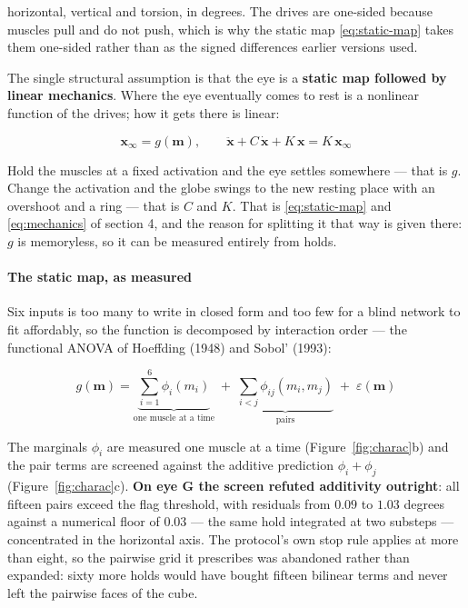 \documentclass[10pt]{article}
\begin{document}
horizontal, vertical and torsion, in degrees. The drives are one-sided because muscles pull
and do not push, which is why the static map \eqref{eq:static-map} takes them one-sided
rather than as the signed differences earlier versions used.

The single structural assumption is that the eye is a \textbf{static map followed by linear
mechanics}. Where the eye eventually comes to rest is a nonlinear function of the drives;
how it gets there is linear:

\begin{equation}
\mathbf{x}_{\infty}=g(\mathbf{m}),
\qquad
\ddot{\mathbf{x}}+C\,\dot{\mathbf{x}}+K\,\mathbf{x}=K\,\mathbf{x}_{\infty}
\label{eq:hammerstein}
\end{equation}

Hold the muscles at a fixed activation and the eye settles somewhere --- that is $g$. Change
the activation and the globe swings to the new resting place with an overshoot and a ring
--- that is $C$ and $K$. That is \eqref{eq:static-map} and \eqref{eq:mechanics} of section
4, and the reason for splitting it that way is given there: $g$ is memoryless, so it can be
measured entirely from holds.

\paragraph{The static map, as measured}

Six inputs is too many to write in closed form and too few for a blind network to fit
affordably, so the function is decomposed by interaction order --- the functional ANOVA of
Hoeffding (1948) and Sobol' (1993):

\begin{equation}
g(\mathbf{m})=
\underbrace{\sum_{i=1}^{6}\phi_i(m_i)}_{\text{one muscle at a time}}
\;+\;
\underbrace{\sum_{i<j}\phi_{ij}(m_i,m_j)}_{\text{pairs}}
\;+\;\varepsilon(\mathbf{m})
\label{eq:anova}
\end{equation}

The marginals $\phi_i$ are measured one muscle at a time (Figure~\ref{fig:charac}b) and the
pair terms are screened against the additive prediction $\phi_i+\phi_j$
(Figure~\ref{fig:charac}c). \textbf{On eye G the screen refuted additivity outright}: all
fifteen pairs exceed the flag threshold, with residuals from $0.09$ to $1.03$ degrees
against a numerical floor of $0.03$ --- the same hold integrated at two substeps ---
concentrated in the horizontal axis. The protocol's own stop rule applies at more than
eight, so the pairwise grid it prescribes was abandoned rather than expanded: sixty more
holds would have bought fifteen bilinear terms and never left the pairwise faces of the
cube.
\end{document}
